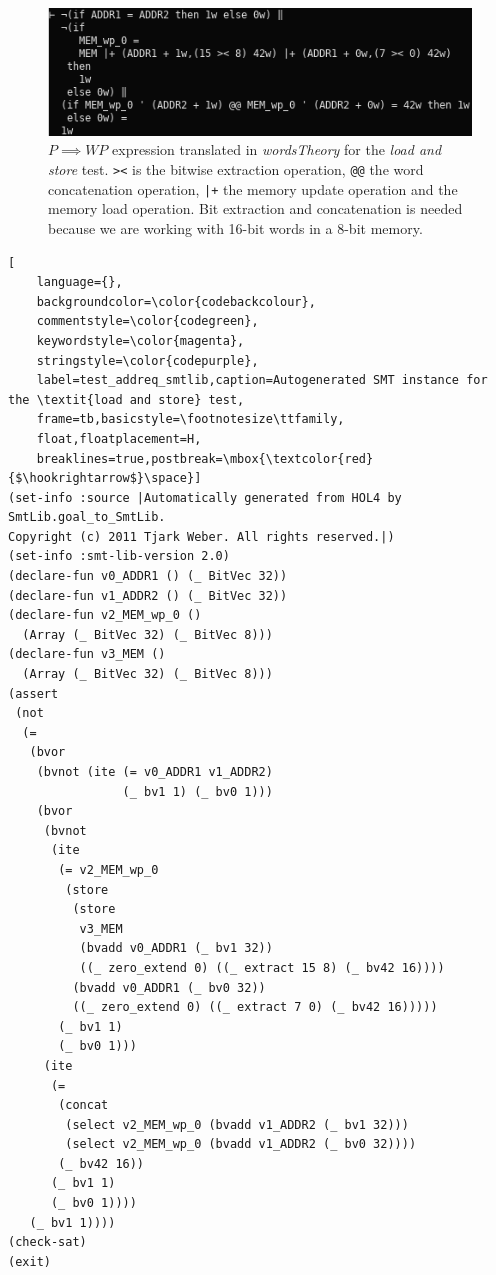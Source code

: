 \documentclass{kththesis}
\newcommand{\WP}{\ensuremath{\mathit{WP}}}
\begin{document}
{\begin{figure}[!h]
	\includegraphics[width=\textwidth]{figures/test_addreq_words.png}
	\centering
	\caption{$P \implies \WP$ expression translated in \textit{wordsTheory} for the \textit{load and store} test. \texttt{><} is the bitwise extraction operation, \texttt{@@} the word concatenation operation, \texttt{|+} the memory update operation and \texttt{\textquotesingle} the memory load operation. Bit extraction and concatenation is needed because we are working with 16-bit words in a 8-bit memory.}
	\label{test_addreq_words}
\end{figure}

\begin{lstlisting}[
    language={},
    backgroundcolor=\color{codebackcolour},
    commentstyle=\color{codegreen},
    keywordstyle=\color{magenta},
    stringstyle=\color{codepurple},
    label=test_addreq_smtlib,caption=Autogenerated SMT instance for the \textit{load and store} test,
    frame=tb,basicstyle=\footnotesize\ttfamily,
    float,floatplacement=H,
    breaklines=true,postbreak=\mbox{\textcolor{red}{$\hookrightarrow$}\space}]
(set-info :source |Automatically generated from HOL4 by SmtLib.goal_to_SmtLib.
Copyright (c) 2011 Tjark Weber. All rights reserved.|)
(set-info :smt-lib-version 2.0)
(declare-fun v0_ADDR1 () (_ BitVec 32))
(declare-fun v1_ADDR2 () (_ BitVec 32))
(declare-fun v2_MEM_wp_0 ()
  (Array (_ BitVec 32) (_ BitVec 8)))
(declare-fun v3_MEM ()
  (Array (_ BitVec 32) (_ BitVec 8)))
(assert
 (not
  (=
   (bvor
    (bvnot (ite (= v0_ADDR1 v1_ADDR2)
                (_ bv1 1) (_ bv0 1)))
    (bvor
     (bvnot
      (ite
       (= v2_MEM_wp_0
        (store
         (store
          v3_MEM
          (bvadd v0_ADDR1 (_ bv1 32))
          ((_ zero_extend 0) ((_ extract 15 8) (_ bv42 16))))
         (bvadd v0_ADDR1 (_ bv0 32))
         ((_ zero_extend 0) ((_ extract 7 0) (_ bv42 16)))))
       (_ bv1 1)
       (_ bv0 1)))
     (ite
      (=
       (concat
        (select v2_MEM_wp_0 (bvadd v1_ADDR2 (_ bv1 32)))
        (select v2_MEM_wp_0 (bvadd v1_ADDR2 (_ bv0 32))))
       (_ bv42 16))
      (_ bv1 1)
      (_ bv0 1))))
   (_ bv1 1))))
(check-sat)
(exit)
\end{lstlisting}

}
\end{document}
